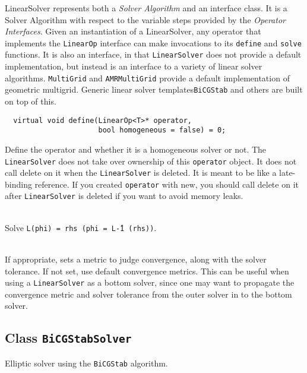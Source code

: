 \begin{itemize}
\begin{itemize}
\begin{itemize}
\begin{itemize}
\begin{itemize}
\begin{itemize}
\begin{itemize}
\begin{itemize}
\begin{itemize}
\begin{itemize}
\begin{itemize}
\begin{itemize}
{\bt LinearSolver} represents both a {\em Solver Algorithm} and an
interface class.  It is a Solver Algorithm with respect to the
variable steps provided by the {\em Operator Interfaces}.  Given an
instantiation of a {\bt LinearSolver}, any operator that implements
the {\tt LinearOp} interface can make invocations to its {\tt define}
and {\tt solve} functions. 
It is also an interface, in that {\tt LinearSolver} does not provide
a default implementation, but instead is an interface to a variety
of linear solver algorithms. 
{\tt  MultiGrid} and {\tt AMRMultiGrid} provide a default implementation
of geometric multigrid. 
Generic linear solver templates{\tt BiCGStab} and others are built on
top of this. 

\begin{itemize}

\I 
\begin{verbatim}
  virtual void define(LinearOp<T>* operator, 
                      bool homogeneous = false) = 0;
\end{verbatim}
Define the operator and whether it is a homogeneous solver or not.
The {\tt LinearSolver} does not take over ownership of this {\tt operator} object.
It does not call delete on it when the {\tt LinearSolver} is deleted.
It is meant to be like a late-binding reference.
If you created {\tt operator} with new, you should call delete on it
 after {\tt LinearSolver} is deleted if you want to avoid memory
 leaks. 

\\ Solve {\tt L(phi) = rhs (phi = L\^-1 (rhs))}.

\\ If appropriate, sets a metric to judge convergence, along with the
solver tolerance. If not set, use default convergence metrics.  This
can be useful when using a {\tt LinearSolver} as a bottom solver,
since one may want to propagate the convergence metric and solver
tolerance from the outer solver in to the bottom solver.  

\ei

\subsection {Class {\tt BiCGStabSolver}}

Elliptic solver using the {\tt BiCGStab} algorithm.



\end{itemize}
\end{itemize}
\end{itemize}
\end{itemize}
\end{itemize}
\end{itemize}
\end{itemize}
\end{itemize}
\end{itemize}
\end{itemize}
\end{itemize}
\end{itemize}
\end{itemize}
